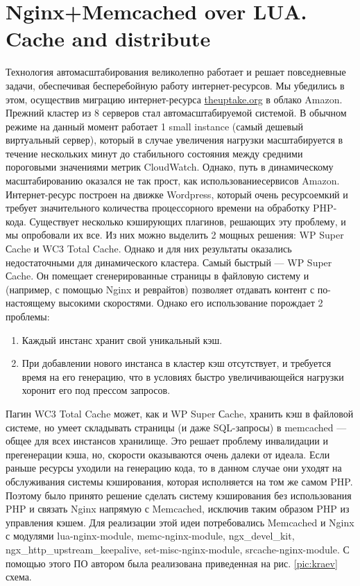 \documentclass[10pt, a5paper]{article}
\begin{document}
\section*{Nginx+Memcached over LUA. Cache and distribute}

Технология автомасштабирования великолепно работает и решает повседневные задачи, обеспечивая бесперебойную работу интернет-ресурсов. Мы убедились в этом, осуществив миграцию интернет-ресурса \url{theuptake.org} в облако Amazon. Прежний кластер из 8 серверов стал автомасштабируемой системой. В обычном режиме на данный момент работает 1 small instance (самый дешевый виртуальный сервер), который в случае увеличения нагрузки масштабируется в течение нескольких минут до стабильного состояния между средними пороговыми значениями метрик CloudWatch. Однако, путь в динамическому масштабированию оказался не так прост, как использованиесервисов Amazon. Интернет-ресурс построен на движке Wordpress, который очень ресурсоемкий и требует значительного количества процессорного времени на обработку PHP-кода. Существует несколько кэширующих плагинов, решающих эту проблему, и мы опробовали их все. Из них можно выделить 2 мощных решения:  WP Super Сache и WC3 Total Cache. Однако и для них результаты оказались недостаточными для динамического кластера. Самый быстрый --- WP Super Сache. Он помещает сгенерированные страницы в файловую систему и (например, с помощью Nginx и реврайтов) позволяет отдавать контент с по-настоящему высокими скоростями. Однако его использование порождает 2 проблемы: 
\begin{enumerate}
	\item Каждый инстанс хранит свой уникальный кэш. 
	\item При добавлении нового инстанса в кластер кэш отсутствует, и требуется время на его генерацию, что в условиях быстро увеличивающейся нагрузки хоронит его под прессом запросов. 
\end{enumerate}

Пагин WC3 Total Cache может, как и WP Super Сache, хранить кэш в файловой системе, но умеет складывать страницы (и даже SQL-запросы) в memcached --- общее для всех инстансов хранилище. Это решает проблему инвалидации и прегенерации кэша, но, скорости оказываются очень далеки от идеала. Если раньше ресурсы уходили на генерацию кода, то в данном случае они уходят на обслуживания системы кэширования, которая исполняется на том же самом PHP. Поэтому было принято решение сделать систему кэширования без использования PHP и связать Nginx напрямую с Memcached, исключив таким образом PHP из управления кэшем. Для реализации этой идеи потребовались Memcached и Nginx с модулями lua-nginx-module, memc-nginx-module, ngx\_devel\_kit,  ngx\_http\_upstream\_keepalive, set-misc-nginx-module, srcache-nginx-module. С помощью этого ПО автором была реализована приведенная на рис. \ref{pic:kraev} схема.
\end{document}
